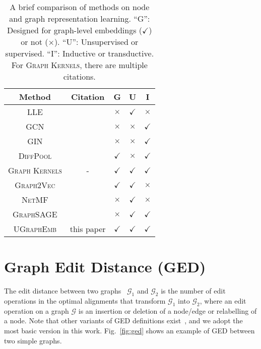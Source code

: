 \documentclass{article}
\newcommand{\model}{\textsc{UGraphEmb}\xspace}
\newcommand{\netmf}{\textsc{NetMF}\xspace}
\newcommand{\graphsage}{\textsc{GraphSAGE}\xspace}
\newcommand{\gk}{\textsc{Graph Kernels}\xspace}
\newcommand{\gv}{\textsc{Graph2Vec}\xspace}
\newcommand{\gcn}{\textsc{GCN}\xspace}
\newcommand{\gin}{\textsc{GIN}\xspace}
\begin{document}
\begin{table}[h]
\small
\vspace*{-2mm}
\begin{tabular}
    {ccccc} \hline
    \textbf{Method} & \textbf{Citation} & \textbf{G} & \textbf{U} & \textbf{I} \\ \hline
    \textsc{LLE} & \cite{belkin2003laplacian} & $\times$ & $\checkmark$ & $\times$ \\ 
\gcn & \cite{kipf2016semi} & $\times$ & $\times$ & $\checkmark$ \\ 
    \gin & \cite{xu2018powerful} & $\times$ & $\times$ & $\checkmark$ \\ 
    \textsc{DiffPool} & \cite{ying2018hierarchical} & $\checkmark$ & $\times$ & $\checkmark$ \\ 
\hline
    \textsc{Graph Kernels} & - & $\checkmark$ & $\checkmark$ & $\checkmark$ \\
    \gv & \cite{narayanan2017graph2vec} & $\checkmark$ & $\checkmark$ & $\times$ \\
\netmf & \cite{qiu2017network} & $\times$ & $\checkmark$ & $\times$ \\ 
    \graphsage & \cite{hamilton2017inductive} & $\times$ & $\checkmark$ & $\checkmark$ \\
\hline
    \model & this paper & $$\checkmark$$ & $\checkmark$ & $\checkmark$ \\
    \hline
\end{tabular}
\centering
\caption{
A brief comparison of methods on node and graph representation learning. ``G'': Designed for graph-level embeddings ($\checkmark$) or not ($\times$). ``U'': Unsupervised or supervised. ``I'': Inductive or transductive. For \gk, there are multiple citations.
}
\label{table:baseline_summary}
\vspace*{-4mm}
\end{table}

\label{sec-related}


 \section{Graph Edit Distance (GED)}
\label{sec-func}



The edit distance between two graphs~\cite{bunke1983distance} $\mathcal{G}_1$ and $\mathcal{G}_2$
is the number of edit operations in the optimal alignments that transform $\mathcal{G}_1$ into $\mathcal{G}_2$, where an edit operation on a graph $\mathcal{G}$ is an insertion or deletion of a node/edge or relabelling of a node. Note that other variants of GED definitions exist~\cite{riesen2013novel}, and we adopt the most basic version in this work.
Fig.~\ref{fig:ged} shows an example of GED between two simple graphs.
\end{document}
